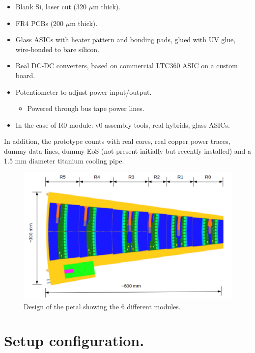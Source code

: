		\begin{itemize}
			\renewcommand{\labelitemi}{$\diamond$}
			\item Blank Si, laser cut (320 $\mu$m thick).
			\item FR4 PCBs (200 $\mu$m thick).
			\item Glass ASICs with heater pattern and bonding pads, glued with UV glue, wire-bonded to bare silicon.
			\item Real DC-DC converters, based on commercial LTC360 ASIC on a custom board.
			\item Potentiometer to adjust power input/output.
			\begin{itemize}
			\renewcommand{\labelitemi}{$\bullet$}
				\item Powered through bus tape power lines.
			\end{itemize}
			\item In the case of R0 module: v0 assembly tools, real hybrids, glass ASICs.
		\end{itemize}
		
		In addition, the prototype counts with real cores, real copper power traces, dummy data-lines, dummy EoS (not present initially but recently installed) and a 1.5 mm diameter titanium cooling pipe.
		
		\begin{figure}[ht!]
			\centering
			\captionsetup{justification=centering,margin=2cm}
			\includegraphics[scale=0.35]{Figures/Chapter02/PetalDesign.pdf}
			\caption{\label{fig9} Design of the petal showing the 6 different modules.}
		\end{figure}
		
	\section{Setup configuration.}
	
